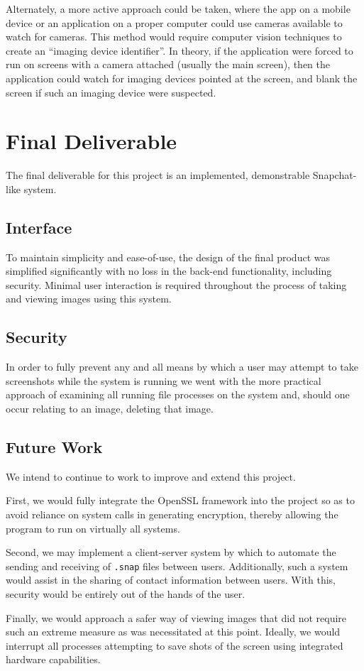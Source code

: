 \documentclass[11pt, a4paper,titlepage]{report}
\begin{document}
Alternately, a more active approach could be taken, where the app on a mobile device or an application on a proper computer could use cameras available to watch for cameras. This method would require computer vision techniques to create an ``imaging device identifier''. In theory, if the application were forced to run on screens with a camera attached (usually the main screen), then the application could watch for imaging devices pointed at the screen, and blank the screen if such an imaging device were suspected. 


\chapter{Final Deliverable}
The final deliverable for this project is an implemented, demonstrable Snapchat-like system.

\section*{Interface}
To maintain simplicity and ease-of-use, the design of the final product was simplified significantly with no loss in the back-end functionality, including security. Minimal user interaction is required throughout the process of taking and viewing images using this system.

\section*{Security}
In order to fully prevent any and all means by which a user may attempt to take screenshots while the system is running we went with the more practical approach of examining all running file processes on the system and, should one occur relating to an image, deleting that image. 

\section*{Future Work}
We intend to continue to work to improve and extend this project. 

First, we would fully integrate the OpenSSL framework into the project so as to avoid reliance on system calls in generating encryption, thereby allowing the program to run on virtually all systems.

Second, we may implement a client-server system by which to automate the sending and receiving of \texttt{.snap} files between users. Additionally, such a system would assist in the sharing of contact information between users. With this, security would be entirely out of the hands of the user.

Finally, we would approach a safer way of viewing images that did not require such an extreme measure as was necessitated at this point. Ideally, we would interrupt all processes attempting to save shots of the screen using integrated hardware capabilities. 

\printbibliography 
\nocite{*}
\end{document}
